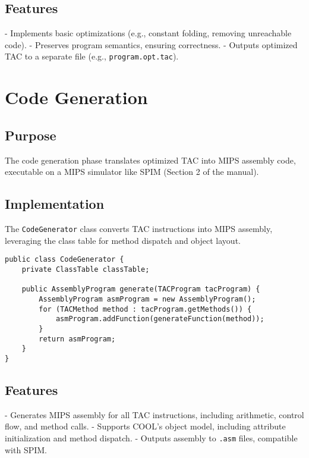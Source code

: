 \documentclass[titlepage]{article}
\begin{document}
\subsection{Features}

- Implements basic optimizations (e.g., constant folding, removing unreachable code).
- Preserves program semantics, ensuring correctness.
- Outputs optimized TAC to a separate file (e.g., \texttt{program.opt.tac}).

\section{Code Generation}

\subsection{Purpose}

The code generation phase translates optimized TAC into MIPS assembly code, executable on a MIPS simulator like SPIM (Section 2 of the manual).

\subsection{Implementation}

The \texttt{CodeGenerator} class converts TAC instructions into MIPS assembly, leveraging the class table for method dispatch and object layout.

\begin{lstlisting}
public class CodeGenerator {
    private ClassTable classTable;

    public AssemblyProgram generate(TACProgram tacProgram) {
        AssemblyProgram asmProgram = new AssemblyProgram();
        for (TACMethod method : tacProgram.getMethods()) {
            asmProgram.addFunction(generateFunction(method));
        }
        return asmProgram;
    }
}
\end{lstlisting}

\subsection{Features}

- Generates MIPS assembly for all TAC instructions, including arithmetic, control flow, and method calls.
- Supports COOL's object model, including attribute initialization and method dispatch.
- Outputs assembly to \texttt{.asm} files, compatible with SPIM.
\end{document}
